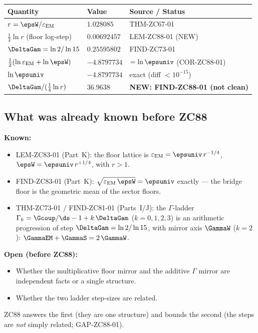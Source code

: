 \documentclass[12pt, a4paper]{article}
\renewcommand{\epsEM}{\varepsilon_{\rm EM}}     %
\begin{document}
\begin{keybox}[title={Numerical Summary --- ZC88 (T-canonical)}]
{\small\renewcommand{\arraystretch}{1.25}
\begin{center}
\begin{tabular}{@{}p{5.4cm}p{2.6cm}p{4.4cm}@{}}
\toprule
\textbf{Quantity} & \textbf{Value} & \textbf{Source / Status} \\
\midrule
$r=\epsW/\epsEM$              & $1.028085$   & THM-ZC67-01 \\
$\tfrac14\ln r$ (floor log-step) & $0.00692457$ & LEM-ZC88-01 (NEW) \\
$\DeltaGam=\ln 2/\ln 15$      & $0.25595802$ & FIND-ZC73-01 \\
$\tfrac12(\ln\epsEM+\ln\epsW)$ & $-4.8797734$ & $=\ln\epsuniv$ (COR-ZC88-01) \\
$\ln\epsuniv$                 & $-4.8797734$ & exact (diff $<10^{-15}$) \\
$\DeltaGam/(\tfrac14\ln r)$   & $36.9638$    & \textbf{NEW: FIND-ZC88-01 (not clean)} \\
\bottomrule
\end{tabular}
\end{center}}
\end{keybox}

\subsection{What was already known before ZC88}

\begin{keybox}[title={Pre-ZC88 Status of the Floor / $\Gamma$ Structures}]
\textbf{Known:}
\begin{itemize}[leftmargin=2em, noitemsep]
  \item LEM-ZC83-01 (Part~K): the floor lattice is
    $\epsEM=\epsuniv\,r^{-1/4}$, $\epsW=\epsuniv\,r^{+1/4}$, with $r>1$.
  \item FIND-ZC83-01 (Part~K): $\sqrt{\epsEM\,\epsW}=\epsuniv$ exactly
    --- the bridge floor is the geometric mean of the sector floors.
  \item THM-ZC73-01 / FIND-ZC81-01 (Parts~I/J): the $\Gamma$-ladder
    $\Gamma_k=\Gcoup/\ds-1+k\,\DeltaGam$ ($k=0,1,2,3$) is an arithmetic
    progression of step $\DeltaGam=\ln 2/\ln 15$, with mirror axis
    $\GammaW$ ($k=2$): $\GammaEM+\GammaS=2\,\GammaW$.
\end{itemize}

\textbf{Open (before ZC88):}
\begin{itemize}[leftmargin=2em, noitemsep]
  \item Whether the multiplicative floor mirror and the additive $\Gamma$
    mirror are independent facts or a single structure.
  \item Whether the two ladder step-sizes are related.
\end{itemize}

ZC88 answers the first (they are one structure) and bounds the second
(the steps are \emph{not} simply related; GAP-ZC88-01).
\end{keybox}
\end{document}
